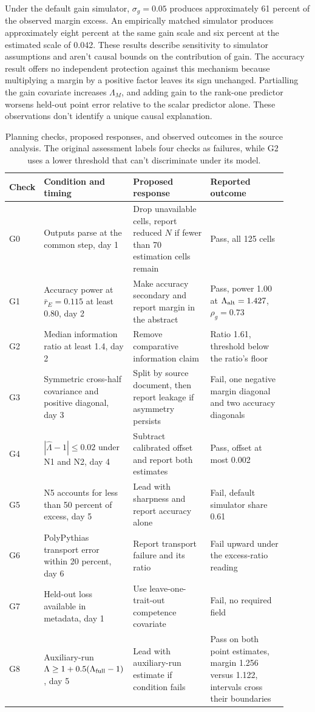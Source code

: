 Under the default gain simulator, $\sigma_g=0.05$ produces approximately 61 percent of the observed margin excess. An empirically matched simulator produces approximately eight percent at the same gain scale and six percent at the estimated scale of 0.042. These results describe sensitivity to simulator assumptions and aren't causal bounds on the contribution of gain. The accuracy result offers no independent protection against this mechanism because multiplying a margin by a positive factor leaves its sign unchanged. Partialling the gain covariate increases $\Lambda_M$, and adding gain to the rank-one predictor worsens held-out point error relative to the scalar predictor alone. These observations don't identify a unique causal explanation.

\begin{table}[htbp]
\centering\small\setlength{\tabcolsep}{3pt}
\caption{Planning checks, proposed responses, and observed outcomes in the source analysis. The original assessment labels four checks as failures, while G2 uses a lower threshold that can't discriminate under its model.}
\label{tab:original5}
\begin{tabular}{p{0.07\linewidth}p{0.28\linewidth}p{0.28\linewidth}p{0.28\linewidth}}\hline
Check & Condition and timing & Proposed response & Reported outcome\\\hline
G0 & Outputs parse at the common step, day 1 & Drop unavailable cells, report reduced $N$ if fewer than 70 estimation cells remain & Pass, all 125 cells\\
G1 & Accuracy power at $\bar r_E=0.115$ at least 0.80, day 2 & Make accuracy secondary and report margin in the abstract & Pass, power 1.00 at $\Lambda_{\rm alt}=1.427$, $\rho_g=0.73$\\
G2 & Median information ratio at least 1.4, day 2 & Remove comparative information claim & Ratio 1.61, threshold below the ratio's floor\\
G3 & Symmetric cross-half covariance and positive diagonal, day 3 & Split by source document, then report leakage if asymmetry persists & Fail, one negative margin diagonal and two accuracy diagonals\\
G4 & $|\widehat\Lambda-1|\leq0.02$ under N1 and N2, day 4 & Subtract calibrated offset and report both estimates & Pass, offset at most 0.002\\
G5 & N5 accounts for less than 50 percent of excess, day 5 & Lead with sharpness and report accuracy alone & Fail, default simulator share 0.61\\
G6 & PolyPythias transport error within 20 percent, day 6 & Report transport failure and its ratio & Fail upward under the excess-ratio reading\\
G7 & Held-out loss available in metadata, day 1 & Use leave-one-trait-out competence covariate & Fail, no required field\\
G8 & Auxiliary-run $\Lambda\geq1+0.5(\Lambda_{\rm full}-1)$, day 5 & Lead with auxiliary-run estimate if condition fails & Pass on both point estimates, margin 1.256 versus 1.122, intervals cross their boundaries\\\hline
\end{tabular}
\end{table}

